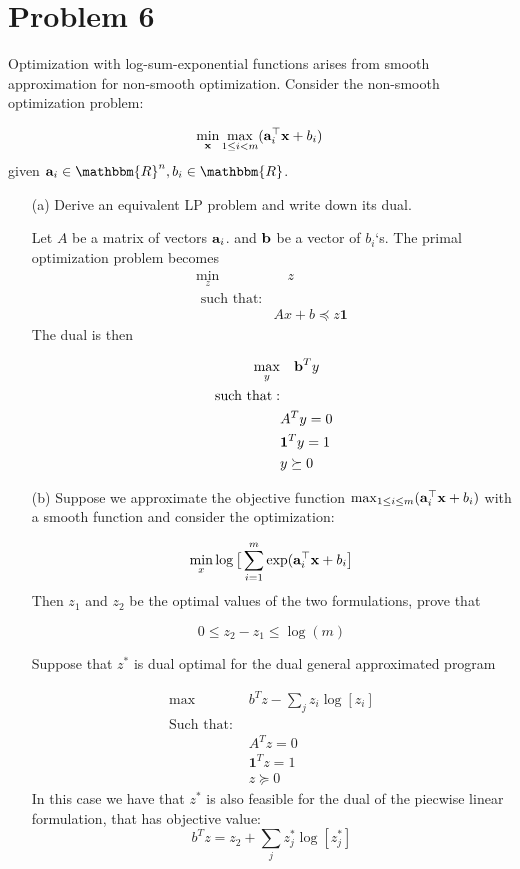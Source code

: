 \documentclass[answers]{exam} %
\newcommand{\R}{\mathbbm{R}}
\newcommand{\B}[1]{\mathbf{#1}}
\renewcommand\a{{\bf a}}
\renewcommand\b{{\bf b}}
\newcommand\x{{\bf x}}
\renewcommand\a{{\bf a}}
\renewcommand\b{{\bf b}}
\begin{document}
\section*{Problem 6}
Optimization with log-sum-exponential functions arises from smooth approximation
for non-smooth optimization. Consider the non-smooth optimization problem:

\[
\min_{\x} \max_{1\leq i < m} (\a_i^{\top} \x + b_i)
\]
given $\a_i \in \R^{n}, b_i \in \R$. 

\begin{itemize}
\item[(a)] Derive an equivalent LP problem and write down its dual. 
\begin{framed}
Let $A$ be a matrix of vectors $\a_i$. and $\b$ be a vector of $b_i$`s. The primal optimization problem becomes 
\begin{equation*}
\begin{aligned}
\min_{z} & \quad  z \\ 
\mbox{ such that}: & \\ 
& Ax + b \preceq z \B{1}
\end{aligned}
\end{equation*}
The dual is then 

\begin{equation*}
\begin{aligned}
\max_{y} & \quad  \b^{T} y \\ 
\mbox{ such that}: & \\ 
& A^T y = 0 \\ 
& \B{1}^{T}y = 1\\ 
& y  \succeq 0
\end{aligned}
\end{equation*}
\end{framed}
\item[(b)]Suppose we approximate the objective function $\max_{1\leq i \leq m}(\a_i^{\top} \x + b_i)$ with a smooth function and consider the optimization:

\[
\min_{x} \log\big[ \sum_{i=1}^{m} \exp(\a_i^{\top} \x + b_i \big]
\]
Then $z_1$ and $z_2$ be the optimal values of the two formulations, prove that 

\[
0 \leq z_2 - z_1 \leq \log(m)
\]

\begin{framed}
Suppose that $z^{*}$ is  dual optimal for the dual general approximated program

\begin{equation*}
\begin{aligned}
\max \quad & b^T z - \sum_{j}z_i \log[z_i] \\ 
\mbox{Such that: } & \\ 
& A^T  z = 0 \\ 
& \B{1}^{T}z = 1\\ 
& z \succeq 0
\end{aligned}
\end{equation*}
In this case we have that $z^*$ is also feasible for the dual of the piecwise linear formulation, that has objective value:
\[
b^T z = z_2 + \sum_{j} z_j^{*} \log[z_j^{*}]
\]


\end{framed}
\end{itemize}
\end{document}
